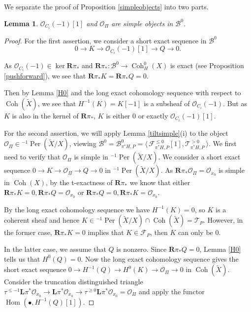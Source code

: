 \documentclass[12pt]{amsart}
\newtheorem{lemma}[theorem]{Lemma}
\theoremstyle{definition}
\DeclareMathOperator{\Hom}{Hom}
\DeclareMathOperator{\Coh}{Coh}
\DeclareMathOperator{\Per}{Per}
\begin{document}
We separate the proof of Proposition \ref{simpleobjects} into two parts.

\begin{lemma}\label{simple1}
$\mathcal{O}_{C_i}(-1)[1]$ and $\mathcal{O}_{\Pi}$ are simple objects in $\mathcal{B}^0$.
\end{lemma}
\begin{proof}
For the first assertion, we consider a short exact sequence in $\mathcal{B}^0$
\[0 \longrightarrow K \longrightarrow \mathcal{O}_{C_i}(-1)[1] \longrightarrow Q \longrightarrow 0.\]

As $\mathcal{O}_{C_i}(-1)\in\ker \mathbf{R}\pi_\ast$ and $\mathbf{R}\pi_\ast \colon \mathcal{B}^0 \longrightarrow \Coh^0_H(X)$ is exact (see Proposition \ref{pushforward}),
we see that $\mathbf{R}\pi_\ast K = \mathbf{R}\pi_\ast Q =0$.

Then by Lemma \ref{H0} and the long exact cohomology sequence with respect to $\Coh(\widetilde{X})$, we see that $H^{-1}(K)=K[-1]$ is a subsheaf of $\mathcal{O}_{C_i}(-1)$.
But as $K$ is also in the kernel of $\mathbf{R}\pi_\ast$, $K$ is either $0$ or exactly $\mathcal{O}_{C_i}(-1)[1]$.

For the second assertion, we will apply Lemma \ref{tiltsimple}(i) to the object $\mathcal{O}_{\Pi} \in {^{-1}\Per(\widetilde{X}/X)}$,
viewing $\mathcal{B}^0=  \mathcal{B}^0_{\pi^\ast H,P} =\langle \, \mathcal{F}^{\leq 0}_{\pi^\ast H,P}[1], \mathcal{T}^{>0}_{\pi^\ast H,P} \,\rangle$.
We first need to verify that $\mathcal{O}_{\Pi}$ is simple in ${^{-1}\Per(\widetilde{X}/X)}$.
We consider a short exact   sequence $ 0 \longrightarrow K \longrightarrow \mathcal{O}_{\Pi} \longrightarrow Q \longrightarrow 0$ in ${^{-1}\Per(\widetilde{X}/X)}$.
As $\mathbf{R}\pi_\ast \mathcal{O}_{\Pi} = \mathcal{O}_{x_0}$ is simple in $\Coh(X)$,  by the t-exactness of $\mathbf{R}\pi_\ast$ we know that either $\mathbf{R}\pi_\ast K=0, \mathbf{R}\pi_\ast Q= \mathcal{O}_{x_0}$ or $\mathbf{R}\pi_\ast Q= 0, \mathbf{R}\pi_\ast K = \mathcal{O}_{x_0}$.

By the long exact cohomology sequence we have $H^{-1}(K)=0$,
so $K$ is a coherent sheaf and hence $K \in {^{-1}\Per(\widetilde{X}/X)} \cap \Coh(\widetilde{X}) = \mathcal{T}_P$.
However, in the former case, $\mathbf{R}\pi_\ast K =0$ implies that $K \in \mathcal{F}_P$,
then $K$ can only be $0$.


In the latter case, we assume that $Q$ is nonzero.
Since $\mathbf{R}\pi_\ast Q =0 $, Lemma \ref{H0} tells us that $H^0(Q)=0$.
Now the long exact cohomology sequence gives the short exact sequence $ 0 \longrightarrow H^{-1}(Q) \longrightarrow H^0(K) \longrightarrow \mathcal{O}_{\Pi} \longrightarrow 0$ in $\Coh(\widetilde{X})$.
Consider the truncation distinguished triangle $\tau^{\leq -1}\mathbf{L}\pi^\ast \mathcal{O}_{x_0} \longrightarrow \mathbf{L}\pi^\ast \mathcal{O}_{x_0} \longrightarrow \tau^{\geq 0}\mathbf{L}\pi^\ast \mathcal{O}_{x_0} =\mathcal{O}_{\Pi}$ and apply the functor $\Hom(\bullet , H^{-1}(Q)[1])$.


\end{proof}
\end{document}
